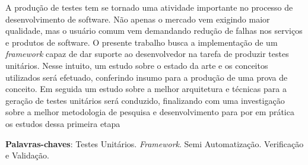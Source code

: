 \begin{resumo}
A produção de testes tem se tornado uma atividade importante no processo de desenvolvimento de software. Não apenas o mercado vem exigindo maior qualidade, mas o usuário comum vem demandando redução de falhas nos serviços e produtos de software. O presente trabalho busca a implementação de um \textit{framework} capaz de dar suporte ao desenvolvedor na tarefa de produzir testes unitários. Nesse intuito, um estudo sobre o estado da arte e os conceitos utilizados será efetuado, conferindo insumo para a produção de uma prova de conceito. Em seguida um estudo sobre a melhor arquitetura e técnicas para a geração de testes unitários será conduzido, finalizando com uma investigação sobre a melhor metodologia de pesquisa e desenvolvimento para por em prática os estudos dessa primeira etapa

\vspace{\onelineskip}
    
\noindent
\textbf{Palavras-chaves}: Testes Unitários. \textit{Framework}. Semi Automatização. Verificação e Validação.
\end{resumo}
